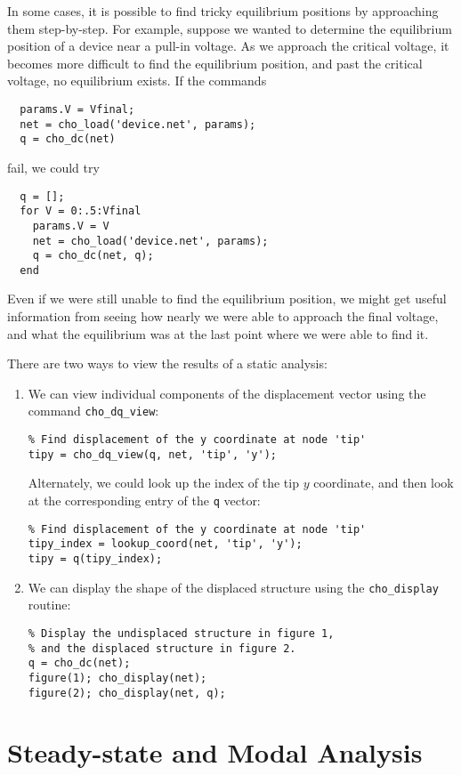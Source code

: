 In some cases, it is possible to find tricky equilibrium positions
by approaching them step-by-step.  For example, suppose we wanted
to determine the equilibrium position of a device near a pull-in
voltage.  As we approach the critical voltage, it becomes more
difficult to find the equilibrium position, and past the critical
voltage, no equilibrium exists.  If the commands
\begin{verbatim}
  params.V = Vfinal;
  net = cho_load('device.net', params);
  q = cho_dc(net)
\end{verbatim}
fail, we could try
\begin{verbatim}
  q = [];
  for V = 0:.5:Vfinal
    params.V = V
    net = cho_load('device.net', params);
    q = cho_dc(net, q);
  end
\end{verbatim}
Even if we were still unable to find the equilibrium position, we might
get useful information from seeing how nearly we were able to approach
the final voltage, and what the equilibrium was at the last point
where we were able to find it.

There are two ways to view the results of a static analysis:
\begin{enumerate}

\item 
We can view individual components of the displacement vector using
the command \texttt{cho\_dq\_view}:
\begin{verbatim}
% Find displacement of the y coordinate at node 'tip'
tipy = cho_dq_view(q, net, 'tip', 'y');
\end{verbatim}
Alternately, we could look up the index of the tip $y$ coordinate,
and then look at the corresponding entry of the \texttt{q} vector:
\begin{verbatim}
% Find displacement of the y coordinate at node 'tip'
tipy_index = lookup_coord(net, 'tip', 'y');
tipy = q(tipy_index);
\end{verbatim}

\item
We can display the shape of the displaced structure using the
\texttt{cho\_display} routine:
\begin{verbatim}
% Display the undisplaced structure in figure 1,
% and the displaced structure in figure 2.
q = cho_dc(net);
figure(1); cho_display(net);
figure(2); cho_display(net, q);
\end{verbatim}

\end{enumerate}


\section{Steady-state and Modal Analysis}

